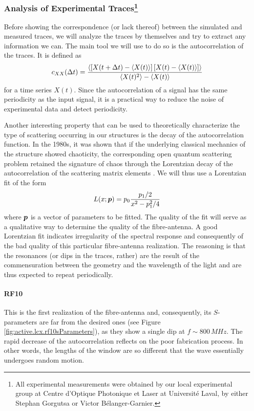 \subsubsection[Analysis of Experimental Traces]{Analysis of Experimental Traces\footnote{All experimental measurements were obtained by our local experimental group at Centre d'Optique Photonique et Laser at Université Laval, by either Stephan Gorgutsa or Victor Bélanger-Garnier.}}
Before showing the correspondence (or lack thereof) between the
simulated and measured traces, we will analyze the traces by themselves
and try to extract any information we can. The main tool 
we will use to do so is the autocorrelation of the traces. It is defined
as 
	\begin{equation}
		c_{XX}(\Delta t) = \frac{\left\langle\left[X(t+\Delta t)-\left\langle X(t)\right\rangle\right]\left[X(t)-\left\langle X(t)\right\rangle\right]\right\rangle}{\left\langle X(t)^2\right\rangle-\left\langle X(t)\right\rangle}
	\end{equation}
for a time series $X(t)$. Since the autocorrelation of a signal has the same periodicity
as the input signal, it is a practical way to reduce the noise of experimental
data and detect periodicity. 

Another interesting property that can be used to theoretically characterize
the type of scattering occurring in our structures is the decay of the 
autocorrelation function. In the 1980s, it was shown that if the underlying
classical mechanics of the structure showed chaoticity, the corresponding
open quantum scattering problem retained the signature of chaos 
through the Lorentzian decay of the autocorrelation of the scattering matrix 
elements \cite{BLU1988,JAL1990}. We will thus use a Lorentzian fit of the form 
	\begin{equation}
		L(x;\boldsymbol{p}) = p_0 \frac{p_1/2}{x^2-p_1^2/4}
	\end{equation}
where $\boldsymbol{p}$ is a vector of parameters to be fitted. The quality of the
fit will serve as a qualitative way to determine the quality of the
fibre-antenna. A good Lorentzian fit indicates irregularity of the spectral
response and consequently of the bad quality of this particular fibre-antenna
realization. The reasoning is that the resonances (or dips in the traces, rather) are the result
of the commensuration between the geometry and the wavelength of the light and 
are thus expected to repeat periodically. 

\paragraph{RF10}
This is the first realization of the fibre-antenna and, 
consequently, its $S$-parameters are far from the desired
ones (see Figure \ref{fig:active.lcx.rf10sParameters}), as they
show a single dip at $f\sim800\,\unit{MHz}$. The rapid decrease
of the autocorrelation reflects on the poor fabrication process.
In other words, the lengths of the window are so different
that the wave essentially undergoes random motion. 

